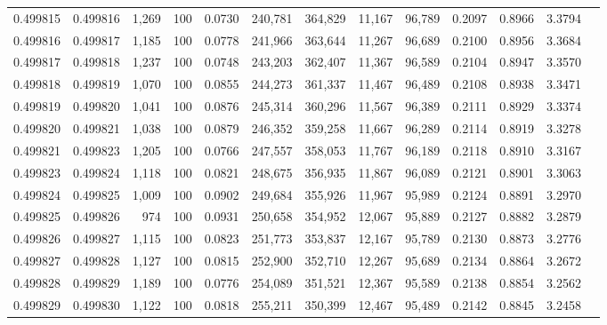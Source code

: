 \begin{tabular}{rrrrrrrrrrrrr}
0.499815 & 0.499816 & 1,269 & 100 &                                     0.0730 & 240,781 & 364,829 &  11,167 &  96,789 & 0.2097 & 0.8966 & 3.3794 \\
0.499816 & 0.499817 & 1,185 & 100 &                                     0.0778 & 241,966 & 363,644 &  11,267 &  96,689 & 0.2100 & 0.8956 & 3.3684 \\
0.499817 & 0.499818 & 1,237 & 100 &                                     0.0748 & 243,203 & 362,407 &  11,367 &  96,589 & 0.2104 & 0.8947 & 3.3570 \\
0.499818 & 0.499819 & 1,070 & 100 &                                     0.0855 & 244,273 & 361,337 &  11,467 &  96,489 & 0.2108 & 0.8938 & 3.3471 \\
0.499819 & 0.499820 & 1,041 & 100 &                                     0.0876 & 245,314 & 360,296 &  11,567 &  96,389 & 0.2111 & 0.8929 & 3.3374 \\
0.499820 & 0.499821 & 1,038 & 100 &                                     0.0879 & 246,352 & 359,258 &  11,667 &  96,289 & 0.2114 & 0.8919 & 3.3278 \\
0.499821 & 0.499823 & 1,205 & 100 &                                     0.0766 & 247,557 & 358,053 &  11,767 &  96,189 & 0.2118 & 0.8910 & 3.3167 \\
0.499823 & 0.499824 & 1,118 & 100 &                                     0.0821 & 248,675 & 356,935 &  11,867 &  96,089 & 0.2121 & 0.8901 & 3.3063 \\
0.499824 & 0.499825 & 1,009 & 100 &                                     0.0902 & 249,684 & 355,926 &  11,967 &  95,989 & 0.2124 & 0.8891 & 3.2970 \\
0.499825 & 0.499826 &   974 & 100 &                                     0.0931 & 250,658 & 354,952 &  12,067 &  95,889 & 0.2127 & 0.8882 & 3.2879 \\
0.499826 & 0.499827 & 1,115 & 100 &                                     0.0823 & 251,773 & 353,837 &  12,167 &  95,789 & 0.2130 & 0.8873 & 3.2776 \\
0.499827 & 0.499828 & 1,127 & 100 &                                     0.0815 & 252,900 & 352,710 &  12,267 &  95,689 & 0.2134 & 0.8864 & 3.2672 \\
0.499828 & 0.499829 & 1,189 & 100 &                                     0.0776 & 254,089 & 351,521 &  12,367 &  95,589 & 0.2138 & 0.8854 & 3.2562 \\
0.499829 & 0.499830 & 1,122 & 100 &                                     0.0818 & 255,211 & 350,399 &  12,467 &  95,489 & 0.2142 & 0.8845 & 3.2458 \\

\end{tabular}
